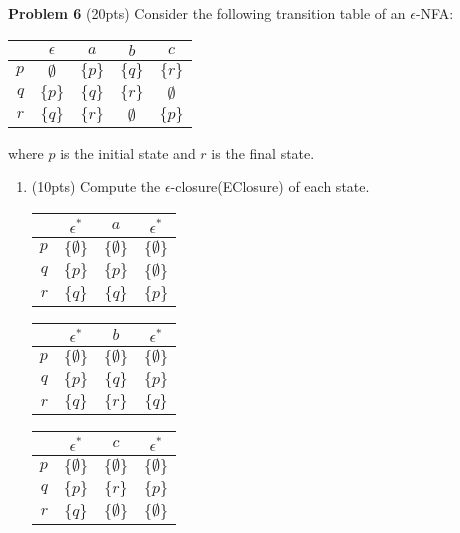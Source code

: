 \documentclass{article}
\begin{document}
\noindent \textbf{Problem 6} (20pts) Consider the following transition table of an $\epsilon$-NFA:
    \begin{center}
    \small
        \begin{tabular}{r||c|c|c|c}
        & $\epsilon$ & $a$ & $b$ & $c$\\ \hline\hline
        $p$ & $\emptyset$ & $\{p\}$ & $\{q\}$ & $\{r\}$\\ 
        $q$ & $\{p\}$ & $\{q\}$ & $\{r\}$ & $\emptyset$\\ 
        $r$ & $\{q\}$ & $\{r\}$ & $\emptyset$ & $\{p\}$\\ 
        \end{tabular}
    \end{center}
    where $p$ is the initial state and $r$ is the final state.
    \begin{enumerate}
        \item (10pts) Compute the $\epsilon$-closure(EClosure) of each state.
            \begin{center}
                \begin{tabular}{r||c|c|c}
                & $\epsilon^{*}$ & $a$ & $\epsilon^{*}$\\ \hline\hline
                $p$ & $\{\emptyset\}$ & $\{\emptyset\}$ & $\{\emptyset\}$\\ 
                $q$ & $\{p\}$ & $\{p\}$ & $\{\emptyset\}$ \\ 
                $r$ & $\{q\}$ & $\{q\}$ & $\{p\}$ \\ 
                \end{tabular}
            \end{center}
            \begin{center}
                \begin{tabular}{r||c|c|c}
                & $\epsilon^{*}$ & $b$ & $\epsilon^{*}$\\ \hline\hline
                $p$ & $\{\emptyset\}$ & $\{\emptyset\}$ & $\{\emptyset\}$\\ 
                $q$ & $\{p\}$ & $\{q\}$ & $\{p\}$ \\ 
                $r$ & $\{q\}$ & $\{r\}$ & $\{q\}$ \\ 
                \end{tabular}
            \end{center}
            \begin{center}
                \begin{tabular}{r||c|c|c}
                & $\epsilon^{*}$ & $c$ & $\epsilon^{*}$\\ \hline\hline
                $p$ & $\{\emptyset\}$ & $\{\emptyset\}$ & $\{\emptyset\}$\\ 
                $q$ & $\{p\}$ & $\{r\}$ & $\{p\}$ \\ 
                $r$ & $\{q\}$ & $\{\emptyset\}$ & $\{\emptyset\}$ \\ 
                \end{tabular}
            \end{center}


\end{enumerate}
\end{document}
